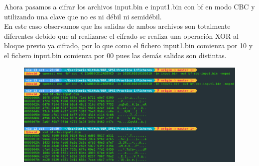 \documentclass[10pt,a4paper,spanish]{report}
\begin{document}
\newpage
\noindent
Ahora pasamos a cifrar los archivos input.bin e input1.bin con bf en modo CBC y utilizando una clave que no es ni débil ni semidébil. \\

\noindent
En este caso observamos que las salidas de ambos archivos son totalmente diferentes debido que al realizarse el cifrado se realiza una operación XOR al bloque previo ya cifrado, por lo que como el fichero input1.bin comienza por 10 y el fichero input.bin comienza por 00 pues las demás salidas son distintas.

\begin{figure}[!hbp]
 \centering  \includegraphics[width=1\textwidth]{./Imagenes/21.png}
\end{figure}


\end{document}
